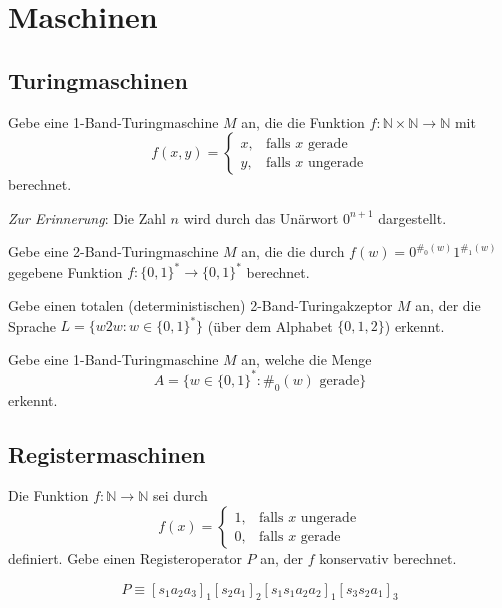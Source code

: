 \documentclass[german,headsepline]{scrartcl}
\theoremstyle{definition}
\begin{document}
	\section{Maschinen}
	
	\subsection{Turingmaschinen}
	\begin{question}[subtitle={Klausur 2012}]
		Gebe eine 1-Band-Turingmaschine $M$ an,
		die die Funktion $f:\mathbb{N}\times\mathbb{N}\to\mathbb{N}$ mit
		\[f(x,y)=\begin{cases}
			x, &\text{falls $x$ gerade} \\
			y, &\text{falls $x$ ungerade}
		\end{cases}\]
		berechnet.
		
		\textit{Zur Erinnerung}: Die Zahl $n$ wird durch das Unärwort $0^{n+1}$ dargestellt.
	\end{question}
	
	\begin{question}[subtitle={Klausur 2014}]
		Gebe eine 2-Band-Turingmaschine $M$ an, die die durch $f(w)=0^{\#_0(w)}1^{\#_1(w)}$ gegebene Funktion $f:\{0,1\}^*\to\{0,1\}^*$ berechnet.
	\end{question}
	
	\begin{question}[subtitle={Klausur 2015}]
		Gebe einen totalen (deterministischen) 2-Band-Turingakzeptor $M$ an,
		der die Sprache $L=\{w2w\colon w\in\{0,1\}^*\}$ (über dem Alphabet $\{0,1,2\}$) erkennt.
	\end{question}
	
	\begin{question}[subtitle={Blatt 13, 2015}]
		Gebe eine 1-Band-Turingmaschine $M$ an, welche die Menge
		\[A=\{w\in\{0,1\}^*\colon\#_0(w)\text{ gerade}\}\]
		erkennt.
	\end{question}
	
	\newpage
	\subsection{Registermaschinen}
	\begin{question}[subtitle={Klausur 2015}]
		Die Funktion $f:\mathbb{N}\to\mathbb{N}$ sei durch
		\[f(x)=\begin{cases}
			1, &\text{falls $x$ ungerade} \\
			0, &\text{falls $x$ gerade}
		\end{cases}\]
		definiert.
		Gebe einen Registeroperator $P$ an, der $f$ konservativ berechnet.
	\end{question}
	\begin{solution}
		\[P\equiv[s_1a_2a_3]_1[s_2a_1]_2[s_1s_1a_2a_2]_1[s_3s_2a_1]_3\]
	\end{solution}
	
\end{document}
